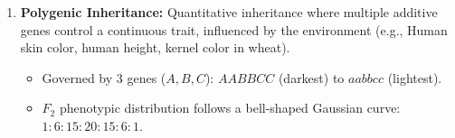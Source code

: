 \documentclass[10pt,a4paper]{article}
\begin{document}
\begin{conceptbox}
\begin{enumerate}[leftmargin=*]
\begin{itemize}
    \item \textit{Starch Synthesis in Pea Seeds:} Gene $B$ controls starch grain size (incomplete dominance: $BB$ large, $Bb$ intermediate, $bb$ small) and seed shape (complete dominance: $BB, Bb$ round, $bb$ wrinkled).
  \end{itemize}
  \item \textbf{Polygenic Inheritance:} Quantitative inheritance where multiple additive genes control a continuous trait, influenced by the environment (e.g., Human skin color, human height, kernel color in wheat).
  \begin{itemize}
    \item Governed by 3 genes ($A, B, C$): $AABBCC$ (darkest) to $aabbcc$ (lightest).
    \item $F_2$ phenotypic distribution follows a bell-shaped Gaussian curve: $1 : 6 : 15 : 20 : 15 : 6 : 1$.
  \end{itemize}
\end{enumerate}
\end{conceptbox}
\end{document}
